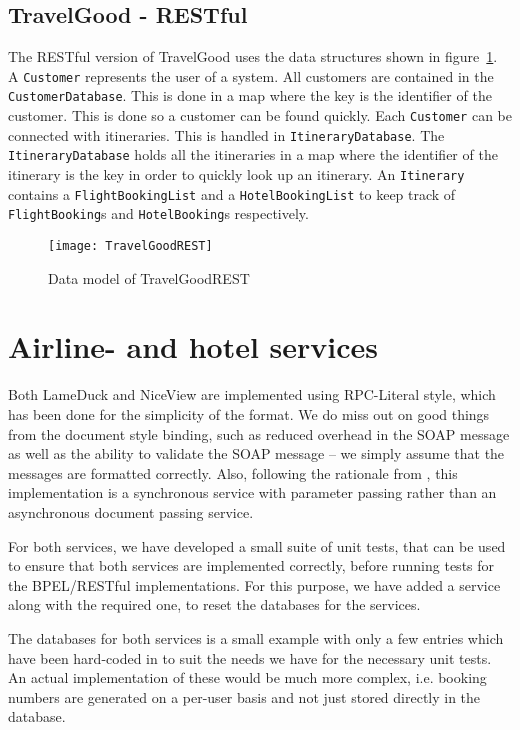 \subsection{TravelGood - RESTful}
The RESTful version of TravelGood uses the data structures shown in figure~\ref{fig:rest_class}. A \texttt{Customer} represents the user of a system. All customers are contained in the \texttt{CustomerDatabase}. This is done in a map where the key is the identifier of the customer. This is done so a customer can be found quickly. Each \texttt{Customer} can be connected with itineraries. This is handled in \texttt{ItineraryDatabase}. The \texttt{ItineraryDatabase} holds all the itineraries in a map where the identifier of the itinerary is the key in order to quickly look up an itinerary. An \texttt{Itinerary} contains a \texttt{FlightBookingList} and a \texttt{HotelBookingList} to keep track of \texttt{FlightBooking}s and \texttt{HotelBooking}s respectively.


\begin{figure}[H]
\centering
\texttt{[image: TravelGoodREST]}
\caption{Data model of TravelGoodREST}
\label{fig:rest_class}
\end{figure}


\section{Airline- and hotel services}
Both LameDuck and NiceView are implemented using RPC-Literal style, which has been done for the simplicity of the format. We do miss out on good things from the document style binding, such as reduced overhead in the SOAP message as well as the ability to validate the SOAP message -- we simply assume that the messages are formatted correctly. 
Also, following the rationale from \cite{papazoglou2008web}, this implementation is a synchronous service with parameter passing rather than an asynchronous document passing service.

For both services, we have developed a small suite of unit tests, that can be used to ensure that both services are implemented correctly, before running tests for the BPEL/RESTful implementations. For this purpose, we have added a service along with the required one, to reset the databases for the services.\medskip

The databases for both services is a small example with only a few entries which have been hard-coded in to suit the needs we have for the necessary unit tests. An actual implementation of these would be much more complex, i.e. booking numbers are generated on a per-user basis and not just stored directly in the database.

